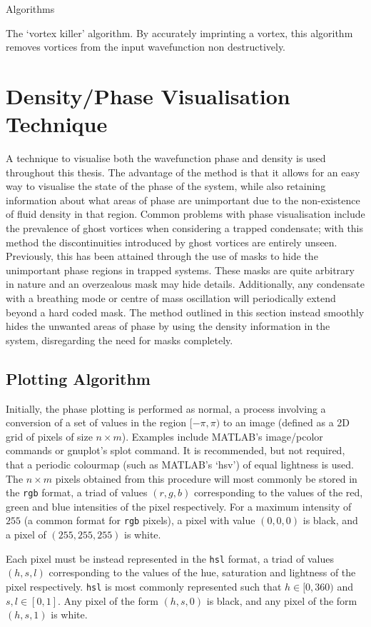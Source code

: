 \begin{chapter}{Algorithms\label{app:algorithms}}
\begin{algorithm}[H]
  \caption{The `vortex killer' algorithm. By accurately imprinting a vortex, this algorithm removes vortices from the input wavefunction non destructively.}\label{algo_vortexkiller}
  \end{algorithm}
\section{\label{appsection:vizalgos} Density/Phase Visualisation Technique}
A technique to visualise both the wavefunction phase and density is used throughout this thesis. The advantage of the method is that it allows for an easy way to visualise the state of the phase of the system, while also retaining information about what areas of phase are unimportant due to the non-existence of fluid density in that region. Common problems with phase visualisation include the prevalence of ghost vortices when considering a trapped condensate; with this method the discontinuities introduced by ghost vortices are entirely unseen. Previously, this has been attained through the use of masks to hide the unimportant phase regions in trapped systems. These masks are quite arbitrary in nature and an overzealous mask may hide details. Additionally, any condensate with a breathing mode or centre of mass oscillation will periodically extend beyond a hard coded mask. The method outlined in this section instead smoothly hides the unwanted areas of phase by using the density information in the system, disregarding the need for masks completely.
\subsection{Plotting Algorithm}
Initially, the phase plotting is performed as normal, a process involving a conversion of a set of values in the region $[-\pi,\pi)$ to an image (defined as a 2D grid of pixels of size $n\times m$). Examples include MATLAB's image/pcolor commands or gnuplot's splot command. It is recommended, but not required, that a periodic colourmap (such as MATLAB's `hsv') of equal lightness is used. The $n \times m$ pixels obtained from this procedure will most commonly be stored in the {\tt rgb} format, a triad of values $(r,g,b)$ corresponding to the values of the red, green and blue intensities of the pixel respectively. For a maximum intensity of $255$ (a common format for {\tt rgb} pixels), a pixel with value $(0,0,0)$ is black, and a pixel of $(255,255,255)$ is white.

Each pixel must be instead represented in the {\tt hsl} format, a triad of values $(h,s,l)$ corresponding to the values of the hue, saturation and lightness of the pixel respectively. {\tt hsl} is most commonly represented such that $h \in [0,360)$ and $s,l \in [0,1]$. Any pixel of the form $(h,s,0)$ is black, and any pixel of the form $(h,s,1)$ is white.


\end{chapter}
